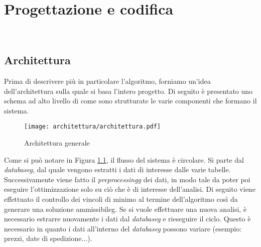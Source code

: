 
\chapter{Progettazione e codifica}
\label{cap:progettazione-codifica}

\noindent {}\\

\section{Architettura}
\label{sec:progettazione}
\noindent Prima di descrivere più in particolare l'algoritmo, forniamo un’idea dell’architettura sulla quale si basa l'intero progetto.
Di seguito è presentato uno schema ad alto livello di come sono strutturate le varie
componenti che formano il sistema.

\begin{figure}[!h] 
    \centering 
    \texttt{[image: architettura/architettura.pdf]} 
    \caption{Architettura generale}
    \label{architettura-generale}
\end{figure}

\noindent Come si può notare in Figura \ref{architettura-generale},
il flusso del sistema è circolare.
Si parte dal \textit{\gls{databaseg}}, dal quale vengono estratti i dati di interesse dalle varie
tabelle. Successivamente viene fatto il \textit{\gls{preprocessingg}} dei dati,
in modo tale da poter poi eseguire l'ottimizzazione solo su
ciò che è di interesse dell'analisi.
Di seguito viene effettuato il controllo dei vincoli di minimo al termine
dell'algoritmo così da generare
una soluzione \gls{ammissibileg}. Se si vuole effettuare una nuova
analisi, è necessario estrarre nuovamente i dati dal
\textit{\gls{databaseg}} e rieseguire il ciclo. Questo è necessario
in quanto i dati all'interno del \textit{\gls{databaseg}} possono variare
(esempio: prezzi, date di spedizione...).

\newpage


